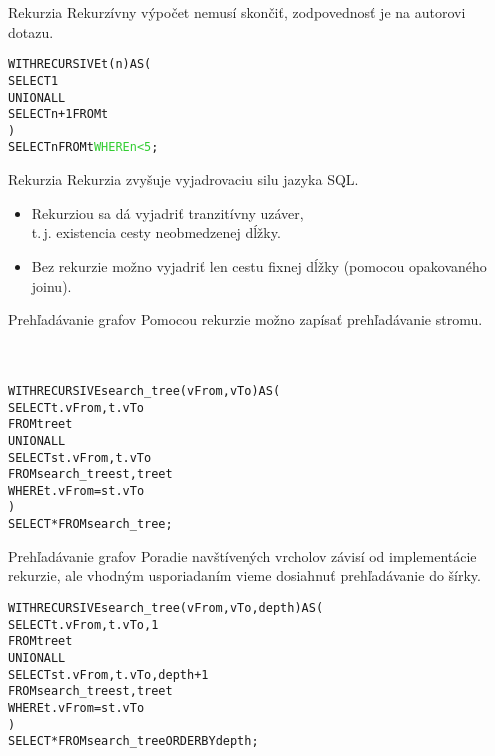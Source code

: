 \documentclass[12pt]{beamer}
\def\blue#1{\textcolor{Cerulean}{#1}}
\def\green#1{\textcolor{LimeGreen}{#1}}
\begin{document}
\begin{frame}[fragile]{Rekurzia}
Rekurzívny výpočet nemusí skončiť, zodpovednosť je na autorovi dotazu.
\bigskip

\begin{alltt}
WITH RECURSIVE t(n) AS (
    SELECT 1
  UNION ALL
    SELECT n+1 FROM t
)
SELECT n FROM t \green{WHERE n < 5};
\end{alltt}
\end{frame}

\begin{frame}[fragile]{Rekurzia}
Rekurzia zvyšuje vyjadrovaciu silu jazyka SQL.
\begin{itemize}
\item Rekurziou sa dá vyjadriť \blue{tranzitívny uzáver},\\ t.\,j. existencia cesty neobmedzenej dĺžky.
\item Bez rekurzie možno vyjadriť len cestu fixnej dĺžky (pomocou opakovaného joinu).
\end{itemize}
\end{frame}

\begin{frame}[fragile]{Prehľadávanie grafov}
Pomocou rekurzie možno zapísať prehľadávanie stromu.\\
\phantom{x}\\ %
\phantom{x}\\
\bigskip

\begin{alltt}
WITH RECURSIVE search_tree(vFrom, vTo) AS (
    SELECT t.vFrom, t.vTo
    FROM tree t
  UNION ALL
    SELECT st.vFrom, t.vTo
    FROM search_tree st, tree t
    WHERE t.vFrom = st.vTo
)
SELECT * FROM search_tree;
\end{alltt}
\end{frame}

\begin{frame}[fragile]{Prehľadávanie grafov}
Poradie navštívených vrcholov závisí od implementácie rekurzie,
ale vhodným usporiadaním vieme dosiahnuť \alert{prehľadávanie do šírky}.
\bigskip
\begin{alltt}
WITH RECURSIVE search_tree(vFrom, vTo, \alert{depth}) AS (
    SELECT t.vFrom, t.vTo, \alert{1}
    FROM tree t
  UNION ALL
    SELECT st.vFrom, t.vTo, \alert{depth + 1}
    FROM search_tree st, tree t
    WHERE t.vFrom = st.vTo
)
SELECT * FROM search_tree \alert{ORDER BY depth};
\end{alltt}
\end{frame}
\end{document}
